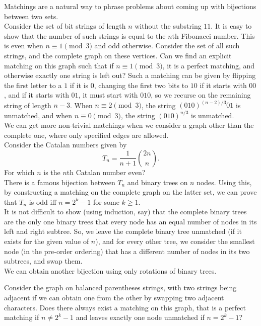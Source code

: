 	Matchings are a natural way to phrase problems about coming up with bijections between two sets.\\

	Consider the set of bit strings of length $n$ without the substring $11$. It is easy to show that the number of such strings is equal to the $n$th Fibonacci number. This is even when $n \equiv 1 \pmod{3}$ and odd otherwise. Consider the set of all such strings, and the complete graph on these vertices. Can we find an explicit matching on this graph such that if $n \equiv 1 \pmod{3}$, it is a perfect matching, and otherwise exactly one string is left out? Such a matching can be given by flipping the first letter to a $1$ if it is $0$, changing the first two bits to $10$ if it starts with $00$, and if it starts with $01$, it must start with $010$, so we recurse on the remaining string of length $n-3$. When $n \equiv 2 \pmod{3}$, the string $(010)^{(n-2)/3}01$ is unmatched, and when $n \equiv 0 \pmod{3}$, the string $(010)^{n/3}$ is unmatched.\\
	We can get more non-trivial matchings when we consider a graph other than the complete one, where only specified edges are allowed.\\

	Consider the Catalan numbers given by
	\[ T_n = \frac{1}{n+1} \binom{2n}{n}. \]
	For which $n$ is the $n$th Catalan number even? \\
	There is a famous bijection between $T_n$ and binary trees on $n$ nodes. Using this, by constructing a matching on the complete graph on the latter set, we can prove that $T_n$ is odd iff $n = 2^k-1$ for some $k \ge 1$.\\
	It is not difficult to show (using induction, say) that the complete binary trees are the only one binary trees that every node has an equal number of nodes in its left and right subtree. So, we leave the complete binary tree unmatched (if it exists for the given value of $n$), and for every other tree, we consider the smallest node (in the pre-order ordering) that has a different number of nodes in its two subtrees, and swap them.\\
	We can obtain another bijection using only rotations of binary trees.

	\begin{question}
		Consider the graph on balanced parentheses strings, with two strings being adjacent if we can obtain one from the other by swapping two adjacent characters. Does there always exist a matching on this graph, that is a perfect matching if $n \ne 2^k-1$ and leaves exactly one node unmatched if $n = 2^k-1$? 
	\end{question}


